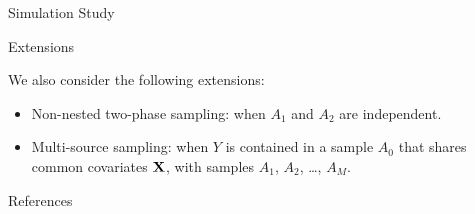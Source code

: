 \documentclass[final]{beamer}
\newlength{\sepwidth}
\newlength{\colwidth}
\newcommand{\separatorcolumn}{\begin{column}{\sepwidth}\end{column}}
\begin{document}
\begin{frame}[t]
\begin{columns}[t]
\begin{column}{\colwidth}
\begin{block}{Simulation Study}
  \begin{table}[ht!]
    \centering
  
  \caption{This table shows the results of the simulation study. It displays the
  Bias, RMSE, empirical 95\% confidence interval, and a t-statistic assessing the
  unbiasedness of each estimator for the estimators: DEE, TP-Reg, DC-Pop, and
  DC-Est.}
  \label{tab:tpdc-mean}
  \end{table}
  \end{block}

  \begin{block}{Extensions}

    We also consider the following extensions:

    \begin{itemize}
      \item Non-nested two-phase sampling: when $A_1$ and $A_2$ are independent.
      \item Multi-source sampling: when $Y$ is contained in a sample $A_0$ that
        shares common covariates $\bf X$, with samples $A_1$, $A_2$, \dots, $A_M$.
    \end{itemize}
  \end{block}


  \begin{block}{References}

    \printbibliography

  \end{block}

\end{column}

\separatorcolumn
\end{columns}
\end{frame}
\end{document}
